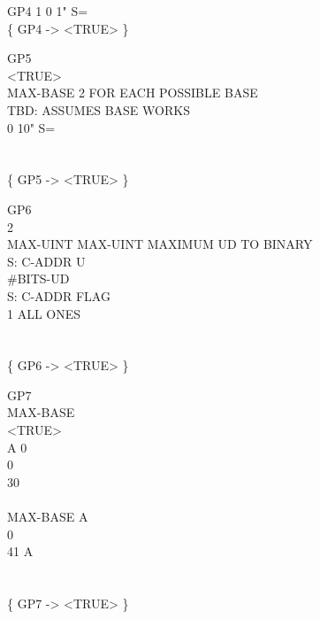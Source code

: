 \begin{tt}
\word{:} GP4   1 0    1" S= \word{;} \\
\{ GP4 -> <TRUE> \}

\word{:} GP5 \\
\tab {}  <TRUE> \\
\tab MAX-BASE  2 		\tab[2]  FOR EACH POSSIBLE BASE \\
\tab[2]   \word{!}	\tab[4.7]  TBD: ASSUMES BASE WORKS \\
\tab[3]  0     10" S=  \\
\tab    {} \\
\tab    {}  \word{!} \word{;} \\
\{ GP5 -> <TRUE> \}

\word{:} GP6 \\
\tab	{}    2  \word{!} \\
\tab	MAX-UINT MAX-UINT   	\tab[2]	   MAXIMUM UD TO BINARY \\
\tab	{}  \word{!}								\tab[10.9]  S: C-ADDR U \\
\tab	{} \#BITS-UD \word{=}  \\
 														\tab[13.4]   S: C-ADDR FLAG \\
\tab[2]		  \word{[CHAR]} 1 \word{=} 	\tab[2.5]  ALL ONES \\
\tab[2]		   \\
\tab	{}   \word{;} \\
\{ GP6 -> <TRUE> \}

\word{:} GP7 \\
\tab	{}  		MAX-BASE  \word{!} \\
\tab	<TRUE> \\
\tab	A 0  \\
\tab[2]		 0    \\
 \word{=}    30 \word{+} \word{=}   \\
\tab	{} \\
\tab	MAX-BASE A  \\
\tab[2]		 0    \\
 \word{=}   41  A \word{-} \word{+} \word{=}   \\
\tab	{} \\
\tab	{}  \word{!} \word{;} \\
\{ GP7 -> <TRUE> \}


\end{tt}
